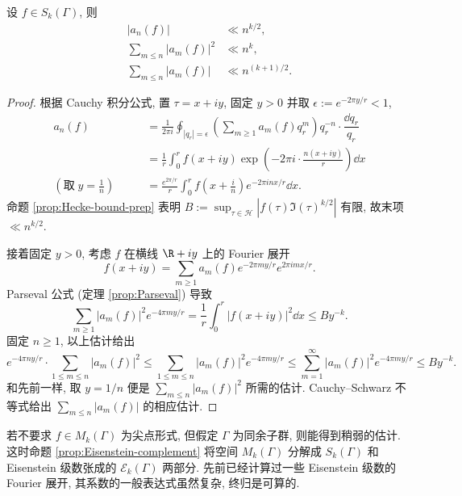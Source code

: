 \begin{theorem}[E.\ Hecke]\label{prop:Hecke-bound}
	设 $f \in S_k(\Gamma)$, 则
	\begin{align*}
		|a_n(f)| & \ll n^{k/2}, \\
		\sum_{m \leq n} |a_m(f)|^2 & \ll n^k, \\
		\sum_{m \leq n} |a_m(f)| & \ll n^{(k+1)/2}.
	\end{align*}
\end{theorem}
\begin{proof}
	根据 Cauchy 积分公式, 置 $\tau = x+iy$, 固定 $y > 0$ 并取 $\epsilon := e^{-2\pi y/r} < 1$,
	\begin{align*}
		a_n(f) & = \frac{1}{2\pi i} \oint_{|q_r| = \epsilon} \left( \sum_{m \geq 1} a_m(f) q_r^m \right) q_r^{-n} \cdot \dfrac{\dd q_r}{q_r} \\
		& = \frac{1}{r} \int_0^r f(x+iy) \exp\left( -2\pi i \cdot \frac{n(x+iy)}{r} \right) \dd x \\
		\left(\text{取}\; y = \frac{1}{n}\right) \qquad & = \frac{e^{2\pi/r}}{r} \int_0^r f\left( x + \frac{i}{n} \right) e^{-2\pi inx/r} \dd x.
	\end{align*}
	命题 \ref{prop:Hecke-bound-prep} 表明 $B := \sup_{\tau \in \mathcal{H}} \left| f(\tau)\Im(\tau)^{k/2} \right|$ 有限, 故末项 $\ll n^{k/2}$. %
	
	接着固定 $y > 0$, 考虑 $f$ 在横线 $\R + iy$ 上的 Fourier 展开
	\[ f\left( x + iy \right) =  \sum_{m \geq 1} a_m(f) e^{-2\pi my/r} e^{2\pi im x/r}. \]
	Parseval 公式 (定理 \ref{prop:Parseval}) 导致
	\[ \sum_{m \geq 1} |a_m(f)|^2 e^{-4\pi my/r}  = \dfrac{1}{r} \int_0^r |f(x + iy)|^2 \dd x \leq B y^{-k}. \]
	固定 $n \geq 1$, 以上估计给出
	\[ e^{-4\pi ny/r} \cdot \sum_{1 \leq m \leq n} |a_m(f)|^2 \leq \sum_{1 \leq m \leq n} |a_m(f)|^2 e^{-4\pi my/r} \leq \sum_{m=1}^\infty |a_m(f)|^2 e^{-4\pi my/r} \leq  B y^{-k}. \]
	和先前一样, 取 $y = 1/n$ 便是 $\sum_{m \leq n} |a_m(f)|^2$ 所需的估计. Cauchy--Schwarz 不等式给出 $\sum_{m \leq n} |a_m(f)|$ 的相应估计.
\end{proof}

若不要求 $f \in M_k(\Gamma)$ 为尖点形式, 但假定 $\Gamma$ 为同余子群, 则能得到稍弱的估计. 这时命题 \ref{prop:Eisenstein-complement} 将空间 $M_k(\Gamma)$ 分解成 $S_k(\Gamma)$ 和 Eisenstein 级数张成的 $\mathcal{E}_k(\Gamma)$ 两部分. 先前已经计算过一些 Eisenstein 级数的 Fourier 展开, 其系数的一般表达式虽然复杂, 终归是可算的.

